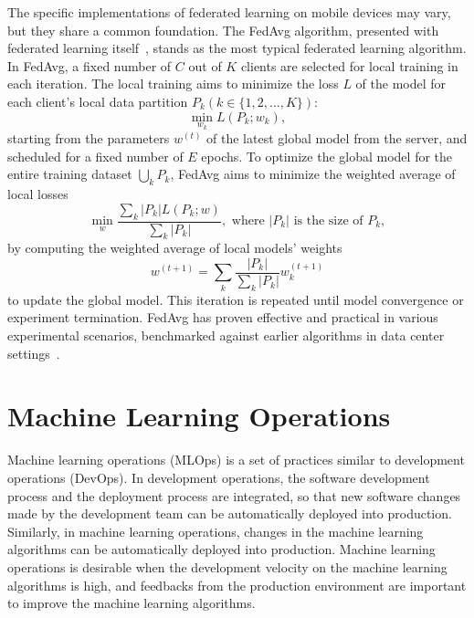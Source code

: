 The specific implementations of federated learning on mobile devices may vary,
but they share a common foundation. The FedAvg algorithm,
presented with federated learning itself~\cite{mcmahan2017communication},
stands as the most typical federated learning algorithm. In FedAvg,
a fixed number of $C$ out of $K$ clients are selected for local training in each
iteration.
The local training aims to minimize the loss $L$ of the model for each client's
local data partition $P_k (k \in \{1, 2, \dots, K\})$:
\begin{equation}
\min_{w_k} L(P_k;w_k),
\end{equation}
starting from the parameters $w^{(t)}$ of the latest global model from the
server, and scheduled for a fixed number of $E$ epochs.
To optimize the global model for the entire training dataset $\bigcup_k P_k$,
FedAvg aims to minimize the weighted average of local losses
\begin{equation}
\min_{w} \frac{\sum_k |P_k|L(P_k;w)}{\sum_k |P_k|},
\text{ where }|P_k|\text{ is the size of }P_k,
\end{equation}
by computing the weighted average of local models' weights
\begin{equation}
w^{(t+1)}=\sum_k \frac{|P_k|}{\sum_k |P_k|}w_k^{(t+1)}
\end{equation}
to update the global model.
This iteration is repeated until model convergence or experiment termination.
FedAvg has proven effective and practical in various experimental scenarios,
benchmarked against earlier algorithms in data center
settings~\cite{bonawitz2019towards}.

\section{Machine Learning Operations}

Machine learning operations (MLOps) is a set of practices similar to
development operations (DevOps).
In development operations,
the software development process and the deployment process are integrated,
so that new software changes made by the development team can be
automatically deployed into production.
Similarly, in machine learning operations,
changes in the machine learning algorithms can be automatically deployed into
production.
Machine learning operations is desirable when the development velocity on
the machine learning algorithms is high,
and feedbacks from the production environment are important to improve
the machine learning algorithms.
